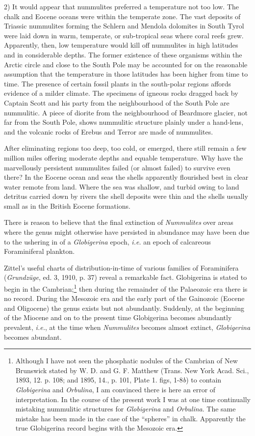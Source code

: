 \documentclass[a4paper, 12pt, oneside]{article}
\begin{document}
2) It would appear that nummulites preferred a temperature not too low. The chalk and Eocene oceans were within the temperate zone. The vast deposits of Triassic nummulites forming the Schlern and Mendola dolomites in South Tyrol were laid down in warm, temperate, or sub-tropical seas where coral reefs grew. Apparently, then, low temperature would kill off nummulites in high latitudes and in considerable depths. The former existence of these organisms within the Arctic circle and close to the South Pole may be accounted for on the reasonable assumption that the temperature in those latitudes has been higher from time to time. The presence of certain fossil plants in the south-polar regions affords evidence of a milder climate. The specimens of igneous rocks dragged back by Captain Scott and his party from the neighbourhood of the South Pole are nummulitic. A piece of diorite from the neighbourhood of Beardmore glacier, not far from the South Pole, shows nummulitic structure plainly under a hand-lens, and the volcanic rocks of Erebus and Terror are made of nummulites.

After eliminating regions too deep, too cold, or emerged, there still remain a few million miles offering moderate depths and equable temperature. Why have the marvellously persistent nummulites failed (or almost failed) to survive even there? In the Eocene ocean and seas the shells apparently flourished best in clear water remote from land. Where the sea was shallow, and turbid owing to land detritus carried down by rivers the shell deposits were thin and the shells usually small as in the British Eocene formations.

There is reason to believe that the final extinction of \emph{Nummulites} over areas where the genus might otherwise have persisted in abundance may have been due to the ushering in of a \emph{Globigerina} epoch, \emph{i.e.} an epoch of calcareous Foraminiferal plankton.

Zittel's useful charts of distribution-in-time of various families of Foraminifera (\emph{Grundzüge}, ed. 3, 1910, p. 37) reveal a remarkable fact. Globigerina is stated to begin in the Cambrian;\footnote{Although I have not seen the phosphatic nodules of the Cambrian of New Brunswick stated by W. D. and G. F. Matthew (Trans. New York Acad. Sci., 1893, 12. p. 108; and 1895, 14., p. 101, Plate 1. figs, 1-8\emph{b}) to contain \emph{Globigerina} and \emph{Orbulina}, I am convinced there is here an error of interpretation. In the course of the present work I was at one time continually mistaking nummulitic structures for \emph{Globigerina} and \emph{Orbulina}. The same mistake has been made in the case of the ``spheres'' in chalk. Apparently the true Globigerina record begins with the Mesozoic era.} then during the remainder of the Palaeozoic era there is no record. During the Mesozoic era and the early part of the Gainozoic (Eocene and Oligocene) the genus exists but not abundantly. Suddenly, at the beginning of the Miocene and on to the present time Globigerina becomes abundantly prevalent, \emph{i.e.}, at the time when \emph{Nummulites} becomes almost extinct, \emph{Globigerina} becomes abundant.
\end{document}
